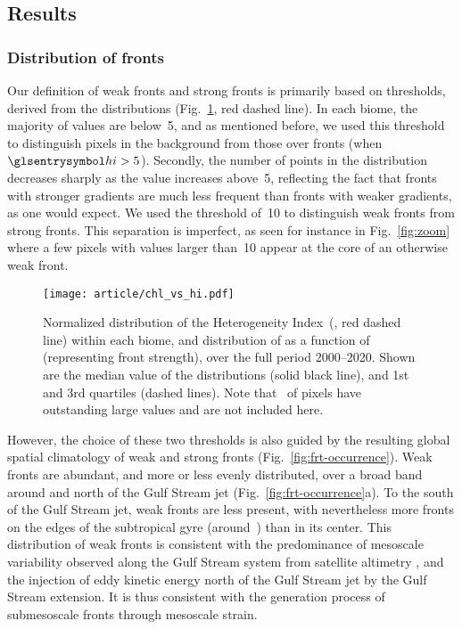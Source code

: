 \subsection{Results}

\subsubsection{Distribution of fronts}

Our definition of weak fronts and strong fronts is primarily based on thresholds, derived from the  distributions (Fig.~\ref{fig:chl-vs-hi}, red dashed line).
In each biome, the majority of  values are below~5, and as mentioned before, we used this threshold to distinguish pixels in the background from those over fronts (when \(\am{hi} > 5\)).
Secondly, the number of points in the  distribution decreases sharply as the  value increases above~5, reflecting the fact that fronts with stronger  gradients are much less frequent than fronts with weaker gradients, as one would expect.
We used the  threshold of~10 to distinguish weak fronts from strong fronts.
This separation is imperfect, as seen for instance in Fig.~\ref{fig:zoom} where a few pixels with  values larger than~10 appear at the core of an otherwise weak front.

\begin{figure}
  \centering
  \texttt{[image: article/chl\_vs\_hi.pdf]}
  \caption[Distribution of  against ]{%
    Normalized distribution of the Heterogeneity Index~(, red dashed line) within each biome, and distribution of  as a function of  (representing front strength), over the full period 2000--2020.
    Shown are the median value of the  distributions (solid black line), and 1st and 3rd quartiles (dashed lines).
    Note that~ of pixels have outstanding large  values and are not included here.
  }%
  \label{fig:chl-vs-hi}
\end{figure}

However, the choice of these two  thresholds is also guided by the resulting global spatial climatology of weak and strong fronts (Fig.~\ref{fig:frt-occurrence}).
Weak fronts are abundant, and more or less evenly distributed, over a broad band around and north of the Gulf Stream jet (Fig.~\ref{fig:frt-occurrence}a).
To the south of the Gulf Stream jet, weak fronts are less present, with nevertheless more fronts on the edges of the subtropical gyre (around~) than in its center.
This distribution of weak fronts is consistent with the predominance of mesoscale variability observed along the Gulf Stream system from satellite altimetry \parencite{zhai_2008}, and the injection of eddy kinetic energy north of the Gulf Stream jet by the Gulf Stream extension.
It is thus consistent with the generation process of submesoscale fronts through mesoscale strain.

